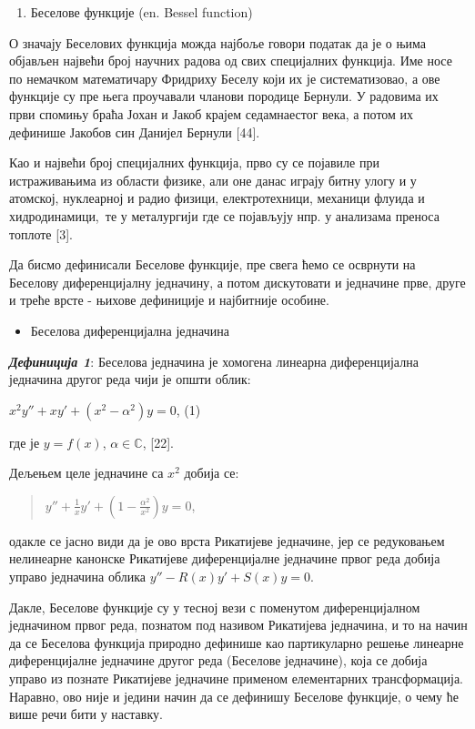 \begin{enumerate}
\def\labelenumi{\arabic{enumi}.}
\item
  Беселове функције (en. Bessel function)
\end{enumerate}

О значају Беселових функција можда најбоље говори податак да је о њима
објављен највећи број научних радова од свих специјалних функција. Име
носе по немачком математичару Фридриху Беселу који их је систематизовао,
а ове функције су пре њега проучавали чланови породице Бернули. У
радовима их први спомињу браћа Јохан и Јакоб крајем седамнаестог века, а
потом их дефинише Јакобов син Данијел Бернули {[}44{]}.~

Као и највећи број специјалних функција, прво су се појавиле при
истраживањима из области физике, али оне данас играју битну улогу и у
атомској, нуклеарној и радио физици, електротехници, механици флуида и
хидродинамици,~те у металургији где се појављују нпр. у анализама
преноса топлоте {[}3{]}.

Да бисмо дефинисали Беселове функције, пре свега ћемо се осврнути на
Беселову диференцијалну једначину, а потом дискутовати и једначине прве,
друге и треће врсте - њихове дефиниције и најбитније особине.

\begin{itemize}
\item
  Беселова диференцијална једначина
\end{itemize}

\emph{\textbf{Дефиниција 1}}: Беселова једначина је хомогена линеарна
диференцијална једначина другог реда чији је општи облик:

\(x^{2}y'' + xy' + \left( x^{2} - \alpha^{2} \right)y = 0\), (1)

где је \(y = f(x)\), \(\alpha\mathbb{\in C}\), {[}22{]}.

Дељењем целе једначине са \(x^{2}\) добија се:

\begin{quote}
\(y'' + \frac{1}{x}y' + \left( 1 - \frac{\alpha^{2}}{x^{2}} \right)y = 0\),
\end{quote}

одакле се јасно види да је ово врста Рикатијеве једначине, јер се
редуковањем нелинеарне канонске Рикатијеве диференцијалне једначине
првог реда добија управо једначина облика \(y'' - R(x)y' + S(x)y = 0\).

Дакле, Беселове функције су у тесној вези с поменутом диференцијалном
једначином првог реда, познатом под називом Рикатијева једначина, и то
на начин да се Беселова функција природно дефинише као партикуларно
решење линеарне диференцијалне једначине другог реда (Беселове
једначине), која се добија управо из познате Рикатијеве једначине
применом елементарних трансформација. Наравно, ово није и једини начин
да се дефинишу Беселове функције, о чему ће више речи бити у наставку.~~

